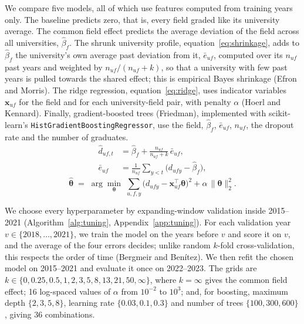 We compare five models, all of which use features computed from training years only. The baseline predicts zero, that is, every field graded like its university average. The common field effect predicts the average deviation of the field across all universities, $\hat\beta_f$. The shrunk university profile, equation~\eqref{eq:shrinkage}, adds to $\hat\beta_f$ the university's own average past deviation from it, $\bar e_{uf}$, computed over its $n_{uf}$ past years and weighted by $n_{uf}/(n_{uf}+k)$, so that a university with few past years is pulled towards the shared effect; this is empirical Bayes shrinkage (Efron and Morris). The ridge regression, equation~\eqref{eq:ridge}, uses indicator variables $\mathbf x_{uf}$ for the field and for each university-field pair, with penalty $\alpha$ (Hoerl and Kennard). Finally, gradient-boosted trees (Friedman), implemented with scikit-learn's \texttt{HistGradientBoostingRegressor}, use the field, $\hat\beta_f$, $\bar e_{uf}$, $n_{uf}$, the dropout rate and the number of graduates.
\begin{equation}
  \begin{aligned}
  \hat d_{uf,t} &= \hat\beta_f + \frac{n_{uf}}{n_{uf}+k}\,\bar e_{uf},\\
  \bar e_{uf} &= \frac{1}{n_{uf}}\sum_{y<t}\bigl(d_{ufy}-\hat\beta_f\bigr),
  \end{aligned}
  \label{eq:shrinkage}
\end{equation}
\begin{equation}
  \hat{\boldsymbol\theta} \;=\; \arg\min_{\boldsymbol\theta}\;\sum_{u,f,y}\bigl(d_{ufy}-\mathbf x_{uf}^{\top}\boldsymbol\theta\bigr)^2 + \alpha\,\lVert\boldsymbol\theta\rVert_2^2 .
  \label{eq:ridge}
\end{equation}

We choose every hyperparameter by expanding-window validation inside 2015--2021 (Algorithm~\ref{alg:tuning}, Appendix~\ref{app:tuning}). For each validation year $v \in \{2018, \dots, 2021\}$, we train the model on the years before $v$ and score it on $v$, and the average of the four errors decides; unlike random $k$-fold cross-validation, this respects the order of time (Bergmeir and Ben\'itez). We then refit the chosen model on 2015--2021 and evaluate it once on 2022--2023. The grids are $k \in \{0, 0.25, 0.5, 1, 2, 3, 5, 8, 13, 21, 50, \infty\}$, where $k = \infty$ gives the common field effect; 16 log-spaced values of $\alpha$ from $10^{-2}$ to $10^{3}$; and, for boosting, maximum depth $\{2, 3, 5, 8\}$, learning rate $\{0.03, 0.1, 0.3\}$ and number of trees $\{100, 300, 600\}$, giving 36 combinations.

